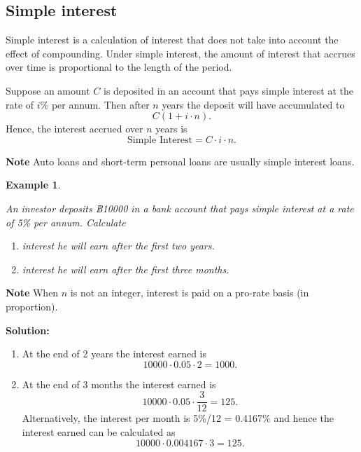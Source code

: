 \documentclass[
]{book}
\theoremstyle{definition}
\theoremstyle{definition}
\newtheorem{example}{Example}[chapter]
\theoremstyle{definition}
\theoremstyle{definition}
\theoremstyle{remark}
\begin{document}
\hypertarget{simple-interest}{%
\subsection{Simple interest}\label{simple-interest}}

Simple interest is a calculation of interest that does not take into
account the effect of compounding. Under simple interest, the amount of interest that accrues over time is proportional to the length of the period.

Suppose an amount \(C\) is deposited in
an account that pays simple interest at the rate of \(i\)\% per annum. Then
after \(n\) years the deposit will have accumulated to
\[C( 1 + i \cdot n).\] Hence, the interest accrued over \(n\) years is
\[\text{Simple Interest}  = C \cdot i \cdot n.\]

\textbf{Note} Auto loans and short-term personal loans are usually simple
interest loans.

\begin{example}
\protect\hypertarget{exm:unlabeled-div-3}{}\label{exm:unlabeled-div-3}

\emph{An investor deposits ฿10000 in a bank account that pays simple interest
at a rate of 5\% per annum. Calculate}

\begin{enumerate}
\def\labelenumi{\arabic{enumi}.}
\item
  \emph{interest he will earn after the first two years.}
\item
  \emph{interest he will earn after the first three months.}
\end{enumerate}

\end{example}

\textbf{Note} When \(n\) is not an integer, interest is paid on a pro-rate
basis (in proportion).

\textbf{Solution:}

\begin{enumerate}
\def\labelenumi{\arabic{enumi}.}
\item
  At the end of 2 years the interest earned is
  \[10000 \cdot 0.05 \cdot 2 = 1000.\]
\item
  At the end of 3 months the interest earned is
  \[10000 \cdot 0.05 \cdot \frac{3}{12} = 125.\] Alternatively, the
  interest per month is 5\%/12 = 0.4167\% and hence the interest earned
  can be calculated as \[10000 \cdot 0.004167 \cdot 3 = 125.\]
\end{enumerate}
\end{document}
